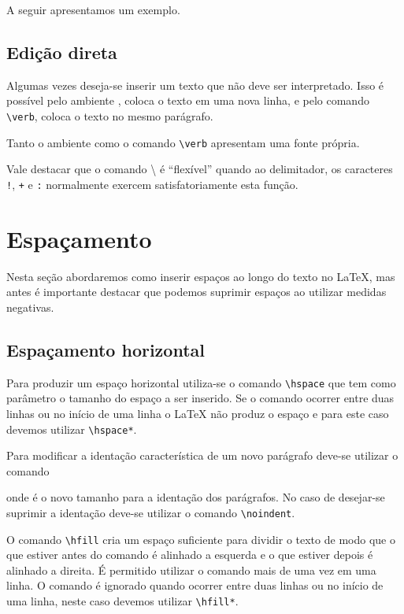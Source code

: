 A seguir apresentamos um exemplo. \\

\subsection{Edição direta}
Algumas vezes deseja-se inserir um texto que não deve ser interpretado. Isso é possível pelo ambiente , coloca o texto em uma nova linha, e pelo comando \lstinline!\verb!, coloca o texto no mesmo parágrafo.

Tanto o ambiente  como o comando \lstinline!\verb! apresentam uma fonte própria. \\

Vale destacar que o comando \textbackslash{} é ``flexível'' quando ao delimitador, os caracteres \lstinline+!+, \lstinline!+! e \lstinline!:! normalmente exercem satisfatoriamente esta função.

\section{Espaçamento}
Nesta seção abordaremos como inserir espaços ao longo do texto no LaTeX, mas antes é importante destacar que podemos suprimir espaços ao utilizar medidas negativas.

\subsection{Espaçamento horizontal}
Para produzir um espaço horizontal utiliza-se o comando \lstinline!\hspace! que tem como parâmetro o tamanho do espaço a ser inserido. Se o comando ocorrer entre duas linhas ou no início de uma linha o LaTeX não produz o espaço e para este caso devemos utilizar  \lstinline!\hspace*!.

Para modificar a identação característica de um novo parágrafo deve-se utilizar o comando
\begin{code}
\setlength{\parident}{tam}
\end{code} 
onde  é o novo tamanho para a identação dos parágrafos. No caso de desejar-se suprimir a identação deve-se utilizar o comando \lstinline!\noindent!.

O comando \lstinline!\hfill! cria um espaço suficiente para dividir o texto de modo que o que estiver antes do comando é alinhado a esquerda e o que estiver depois é alinhado a direita. É permitido utilizar o comando mais de uma vez em uma linha. O comando é ignorado quando ocorrer entre duas linhas ou no início de uma linha, neste caso devemos utilizar \lstinline!\hfill*!.

